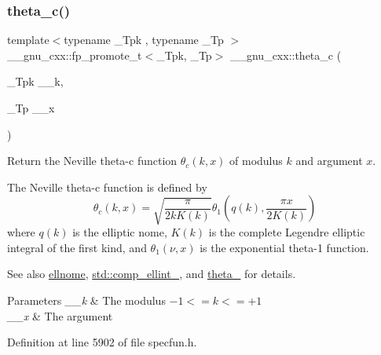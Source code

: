\subsubsection{\texorpdfstring{theta\+\_\+c()}{theta\_c()}}
{\footnotesize\ttfamily template$<$typename \+\_\+\+Tpk , typename \+\_\+\+Tp $>$ \\
\+\_\+\+\_\+gnu\+\_\+cxx\+::fp\+\_\+promote\+\_\+t$<$\+\_\+\+Tpk, \+\_\+\+Tp$>$ \+\_\+\+\_\+gnu\+\_\+cxx\+::theta\+\_\+c (\begin{DoxyParamCaption}\item[{\+\_\+\+Tpk}]{\+\_\+\+\_\+k,  }\item[{\+\_\+\+Tp}]{\+\_\+\+\_\+x }\end{DoxyParamCaption})\hspace{0.3cm}{\ttfamily [inline]}}

Return the Neville theta-\/c function $ \theta_c(k,x) $ of modulus $ k $ and argument $ x $.

The Neville theta-\/c function is defined by \[ \theta_c(k,x) = \sqrt{\frac{\pi}{2 k K(k)}} \theta_1\left(q(k),\frac{\pi x}{2K(k)}\right) \] where $ q(k) $ is the elliptic nome, $ K(k) $ is the complete Legendre elliptic integral of the first kind, and $ \theta_1(\nu,x) $ is the exponential theta-\/1 function. \begin{DoxySeeAlso}{See also}
\hyperlink{group__gnu__math__spec__func_ga7bfb34f8b5c0ed7c72040f9cb7034bba}{ellnome}, \hyperlink{group__cxx17__math__spec__func_gad559217fb01e7a8b7a6e23eeedda64be}{std\+::comp\+\_\+ellint\+\_}, and \hyperlink{group__gnu__math__spec__func_gaa2e5a3a5f550fe032a596a8b01c878c0}{theta\+\_} for details.
\end{DoxySeeAlso}

\begin{DoxyParams}{Parameters}
{\em \+\_\+\+\_\+k} & The modulus $ -1 <= k <= +1 $ \\
\hline
{\em \+\_\+\+\_\+x} & The argument \\
\hline
\end{DoxyParams}


Definition at line 5902 of file specfun.\+h.

\mbox{\label{group__gnu__math__spec__func_ga409f898afeaad5e25726ad552cfe6946}} 
